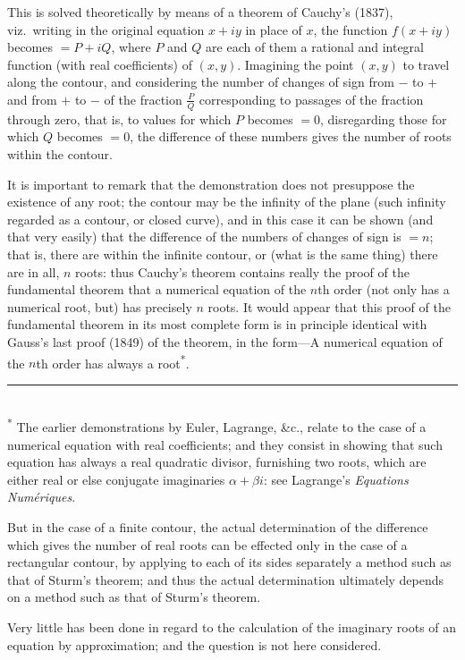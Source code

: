 \documentclass[11pt,a4paper]{article}
\begin{document}
This is solved theoretically by means of a theorem of Cauchy's (1837), viz.\ writing in the original equation $x + iy$ in place of $x$, the function $f(x + iy)$ becomes $= P + iQ$, where $P$ and $Q$ are each of them a rational and integral function (with real coefficients) of $(x, y)$. Imagining the point $(x, y)$ to travel along the contour, and considering the number of changes of sign from $-$ to $+$ and from $+$ to $-$ of the fraction $\frac{P}{Q}$ corresponding to passages of the fraction through zero, that is, to values for which $P$ becomes $=0$, disregarding those for which $Q$ becomes $=0$, the difference of these numbers gives the number of roots within the contour.

It is important to remark that the demonstration does not presuppose the existence of any root; the contour may be the infinity of the plane (such infinity regarded as a contour, or closed curve), and in this case it can be shown (and that very easily) that the difference of the numbers of changes of sign is $= n$; that is, there are within the infinite contour, or (what is the same thing) there are in all, $n$ roots: thus Cauchy's theorem contains really the proof of the fundamental theorem that a numerical equation of the $n$th order (not only has a numerical root, but) has precisely $n$ roots. It would appear that this proof of the fundamental theorem in its most complete form is in principle identical with Gauss's last proof (1849) of the theorem, in the form---A numerical equation of the $n$th order has always a root\textsuperscript{*}.

\smallskip
\noindent\rule{0.4\textwidth}{0.4pt}\\
\small\textsuperscript{*} The earlier demonstrations by Euler, Lagrange, \&c., relate to the case of a numerical equation with real coefficients; and they consist in showing that such equation has always a real quadratic divisor, furnishing two roots, which are either real or else conjugate imaginaries $\alpha + \beta i$: see Lagrange's \textit{Equations Num\'{e}riques}.
\normalsize

But in the case of a finite contour, the actual determination of the difference which gives the number of real roots can be effected only in the case of a rectangular contour, by applying to each of its sides separately a method such as that of Sturm's theorem; and thus the actual determination ultimately depends on a method such as that of Sturm's theorem.

Very little has been done in regard to the calculation of the imaginary roots of an equation by approximation; and the question is not here considered.
\end{document}
